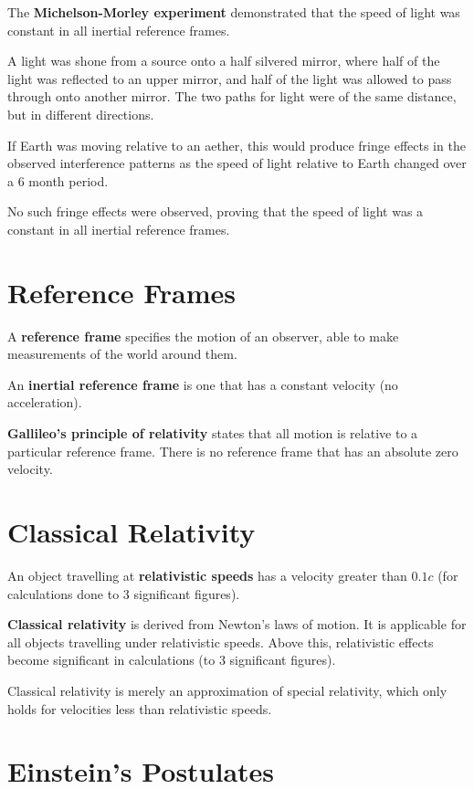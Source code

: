 \documentclass[a4paper,11pt]{report}
\begin{document}

The \textbf{Michelson-Morley experiment} demonstrated that the speed of light
was constant in all inertial reference frames.

A light was shone from a source onto a half silvered mirror, where half of the
light was reflected to an upper mirror, and half of the light was allowed to
pass through onto another mirror. The two paths for light were of the same
distance, but in different directions.

If Earth was moving relative to an aether, this would produce fringe effects
in the observed interference patterns as the speed of light relative to Earth
changed over a 6 month period.

No such fringe effects were observed, proving that the speed of light was
a constant in all inertial reference frames.


\section{Reference Frames}

A \textbf{reference frame} specifies the motion of an observer, able to make
measurements of the world around them.

An \textbf{inertial reference frame} is one that has a constant velocity (no
acceleration).

\textbf{Gallileo's principle of relativity} states that all motion is relative
to a particular reference frame. There is no reference frame that has an
absolute zero velocity.


\section{Classical Relativity}

An object travelling at \textbf{relativistic speeds} has a velocity greater
than $0.1c$ (for calculations done to 3 significant figures).

\textbf{Classical relativity} is derived from Newton's laws of motion. It is
applicable for all objects travelling under relativistic speeds. Above this,
relativistic effects become significant in calculations (to 3 significant
figures).

Classical relativity is merely an approximation of special relativity, which
only holds for velocities less than relativistic speeds.


\section{Einstein's Postulates}
\end{document}
